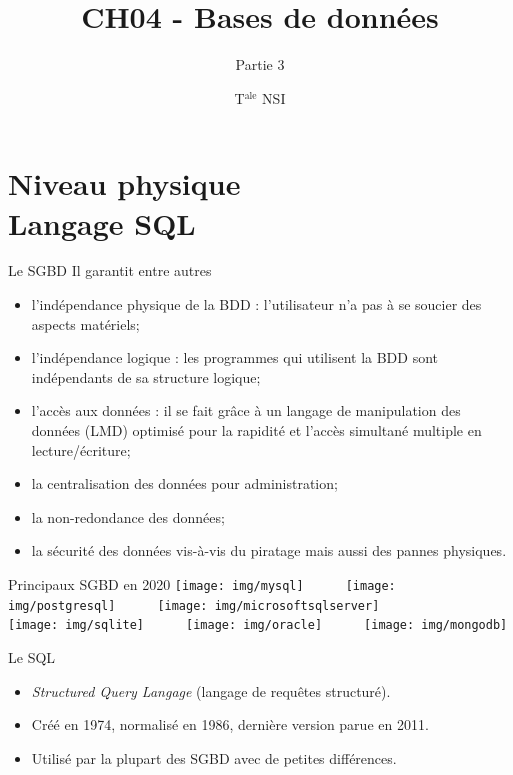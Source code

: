 \documentclass[10pt]{beamer}
\title{CH04 - Bases de données}
\subtitle{Partie 3}
\author{T$^{\text{ale}}$ NSI}
\begin{document}
	\maketitle
    \section{Niveau physique\\ Langage SQL}
\begin{frame}{Le SGBD}
Il garantit entre autres\pause
\begin{itemize}
	\item	\alert{l'indépendance physique} de la BDD : l'utilisateur n'a pas à se soucier des aspects matériels;\pause
	\item	\alert{l'indépendance logique} : les programmes qui utilisent la BDD sont indépendants de sa structure logique;\pause
    \item 	\alert{l'accès aux données} : il se fait grâce à un \alert{langage de manipulation des données} (LMD) optimisé pour la rapidité et l'accès simultané multiple en lecture/écriture;\pause
    \item 	\alert{la centralisation des données pour administration};\pause
    \item 	\alert{la non-redondance des données};\pause
    \item 	\alert{la sécurité des données} vis-à-vis du piratage mais aussi des pannes physiques.
\end{itemize}
\end{frame}

\begin{frame}{Principaux SGBD en 2020}
	\texttt{[image: img/mysql]}\ \ \ \ \ \ \texttt{[image: img/postgresql]}\ \ \ \ \ \ \texttt{[image: img/microsoftsqlserver]}\\

	\texttt{[image: img/sqlite]}\ \ \ \ \ \ \texttt{[image: img/oracle]}\ \ \ \ \ \ \texttt{[image: img/mongodb]}

\end{frame}
\begin{frame}{Le SQL}
\begin{itemize}
    \item	\textit{Structured Query Langage} (langage de requêtes structuré).\pause
	\item	Créé en 1974, normalisé en 1986, dernière version parue en 2011.\pause
    \item 	Utilisé par la plupart des SGBD avec de petites différences.
\end{itemize}

\end{frame}
\end{document}
